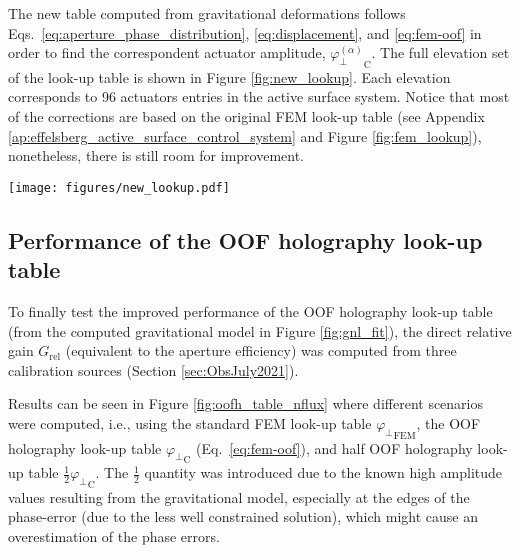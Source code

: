 \documentclass[
    ]
    {aa}
\begin{document}
    The new table computed from gravitational deformations follows Eqs.~\eqref{eq:aperture_phase_distribution}, \eqref{eq:displacement}, and \eqref{eq:fem-oof} in order to find the correspondent actuator amplitude, ${\varphi^{(\alpha)}_\bot}_\text{C}$. The full elevation set of the look-up table is shown in Figure \ref{fig:new_lookup}. Each elevation corresponds to \num{96} actuators entries in the active surface system.
    Notice that most of the corrections are based on the original FEM look-up table (see Appendix \ref{ap:effelsberg_active_surface_control_system} and Figure \ref{fig:fem_lookup}), nonetheless, there is still room for improvement.

    \begin{figure*}
        \centering
        \texttt{[image: figures/new\_lookup.pdf]}
        \caption{Computation of the new look-up table with OOF holography and FEM corrections. Each panel shows the expected amplitude ${\varphi_\bot}_\text{C}$ per elevation $\alpha$ with its rms value, $\delta_\text{rms}$. The table is based on the gravitational model (shown in Figure \ref{fig:gnl_fit}) and default FEM look-up table (Appendix \ref{fig:fem_lookup}). The table is a result of multiple OOF holography observations at several elevations in order to create a reliable gravitational model (Eq.~\ref{eq:gravity}). The contour lines are between \SIlist{-2000;2000}{\micro\m}, with \SI{400}{\micro\m} intervals.}
        \label{fig:new_lookup}
    \end{figure*}

    \subsection{Performance of the OOF holography look-up table}
    \label{sec:performance_of_the_oof_holography_look-up_table}

    To finally test the improved performance of the OOF holography look-up table (from the computed gravitational model in Figure \ref{fig:gnl_fit}), the direct relative gain $G_\text{rel}$ (equivalent to the aperture efficiency) was computed from three calibration sources (Section \ref{sec:ObsJuly2021}).

    Results can be seen in Figure \ref{fig:oofh_table_nflux} where different scenarios were computed, i.e., using the standard FEM look-up table ${\varphi_\bot}_\text{FEM}$, the OOF holography look-up table ${\varphi_\bot}_\text{C}$ (Eq.~\ref{eq:fem-oof}), and half OOF holography look-up table $\frac{1}{2}{\varphi_\bot}_\text{C}$. The $\frac{1}{2}$ quantity was introduced due to the known high amplitude values resulting from the gravitational model, especially at the edges of the phase-error (due to the less well constrained solution), which might cause an overestimation of the phase errors.
    
\end{document}
